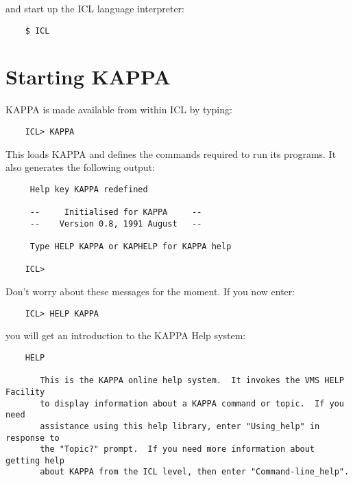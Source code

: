 and start up the ICL language interpreter:

\begin{small}
\begin{verbatim}
    $ ICL
\end{verbatim}
\end{small}


\section {Starting KAPPA}
\label{S_startkap}

KAPPA is made available from within ICL by typing:

\begin{small}
\begin{verbatim}
    ICL> KAPPA
\end{verbatim}
\end{small}

This loads KAPPA and defines the commands required to run its programs.
It also generates the following output:

\begin{small}
\begin{verbatim}
     Help key KAPPA redefined

     --     Initialised for KAPPA     --
     --    Version 0.8, 1991 August   --

     Type HELP KAPPA or KAPHELP for KAPPA help

    ICL>
\end{verbatim}
\end{small}

Don't worry about these messages for the moment.
If you now enter:

\begin{small}
\begin{verbatim}
    ICL> HELP KAPPA
\end{verbatim}
\end{small}

you will get an
introduction to the KAPPA Help system:

\begin{small}
\begin{verbatim}
    HELP

       This is the KAPPA online help system.  It invokes the VMS HELP Facility
       to display information about a KAPPA command or topic.  If you need
       assistance using this help library, enter "Using_help" in response to
       the "Topic?" prompt.  If you need more information about getting help
       about KAPPA from the ICL level, then enter "Command-line_help".
\end{verbatim}
\end{small}

